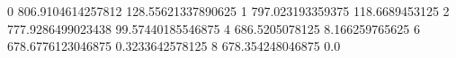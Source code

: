 0 806.9104614257812 128.55621337890625
1 797.023193359375 118.6689453125
2 777.9286499023438 99.57440185546875
4 686.5205078125 8.166259765625
6 678.6776123046875 0.3233642578125
8 678.354248046875 0.0
